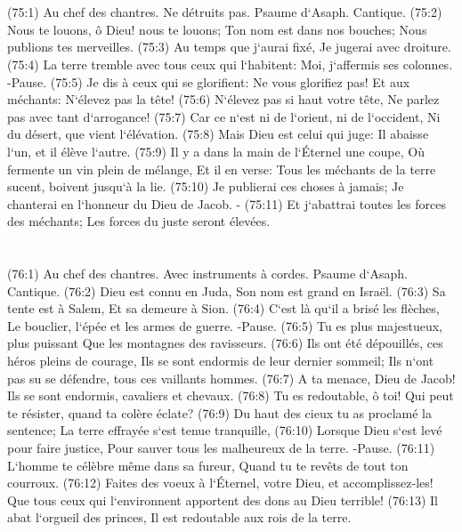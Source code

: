 \chapter{}

\verse (75:1) Au chef des chantres. Ne détruits pas. Psaume d`Asaph. Cantique. (75:2) Nous te louons, ô Dieu! nous te louons; Ton nom est dans nos bouches; Nous publions tes merveilles. 
\verse (75:3) Au temps que j`aurai fixé, Je jugerai avec droiture. 
\verse (75:4) La terre tremble avec tous ceux qui l`habitent: Moi, j`affermis ses colonnes. -Pause. 
\verse (75:5) Je dis à ceux qui se glorifient: Ne vous glorifiez pas! Et aux méchants: N`élevez pas la tête! 
\verse (75:6) N`élevez pas si haut votre tête, Ne parlez pas avec tant d`arrogance! 
\verse (75:7) Car ce n`est ni de l`orient, ni de l`occident, Ni du désert, que vient l`élévation. 
\verse (75:8) Mais Dieu est celui qui juge: Il abaisse l`un, et il élève l`autre. 
\verse (75:9) Il y a dans la main de l`Éternel une coupe, Où fermente un vin plein de mélange, Et il en verse: Tous les méchants de la terre sucent, boivent jusqu`à la lie. 
\verse (75:10) Je publierai ces choses à jamais; Je chanterai en l`honneur du Dieu de Jacob. - 
\verse (75:11) Et j`abattrai toutes les forces des méchants; Les forces du juste seront élevées. 

\chapter{}

\verse (76:1) Au chef des chantres. Avec instruments à cordes. Psaume d`Asaph. Cantique. (76:2) Dieu est connu en Juda, Son nom est grand en Israël. 
\verse (76:3) Sa tente est à Salem, Et sa demeure à Sion. 
\verse (76:4) C`est là qu`il a brisé les flèches, Le bouclier, l`épée et les armes de guerre. -Pause. 
\verse (76:5) Tu es plus majestueux, plus puissant Que les montagnes des ravisseurs. 
\verse (76:6) Ils ont été dépouillés, ces héros pleins de courage, Ils se sont endormis de leur dernier sommeil; Ils n`ont pas su se défendre, tous ces vaillants hommes. 
\verse (76:7) A ta menace, Dieu de Jacob! Ils se sont endormis, cavaliers et chevaux. 
\verse (76:8) Tu es redoutable, ô toi! Qui peut te résister, quand ta colère éclate? 
\verse (76:9) Du haut des cieux tu as proclamé la sentence; La terre effrayée s`est tenue tranquille, 
\verse (76:10) Lorsque Dieu s`est levé pour faire justice, Pour sauver tous les malheureux de la terre. -Pause. 
\verse (76:11) L`homme te célèbre même dans sa fureur, Quand tu te revêts de tout ton courroux. 
\verse (76:12) Faites des voeux à l`Éternel, votre Dieu, et accomplissez-les! Que tous ceux qui l`environnent apportent des dons au Dieu terrible! 
\verse (76:13) Il abat l`orgueil des princes, Il est redoutable aux rois de la terre. 

